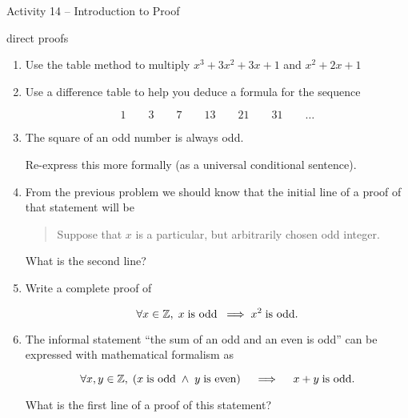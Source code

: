 \documentclass{amsart}
\begin{document}
\thispagestyle{empty}

\centerline{\Large Activity 14 -- Introduction to Proof}
\centerline{\large direct proofs}

\bigskip
\Large


\begin{enumerate}

\item Use the table method to multiply $x^3 + 3x^2 + 3x + 1$ and $x^2 + 2x + 1$

\vfill

\item Use a difference table to help you deduce a formula for the sequence

\[ 1 \qquad 3 \qquad 7 \qquad 13 \qquad 21 \qquad 31 \qquad \ldots \]


\vfill

\newpage

\item The square of an odd number is always odd.

Re-express this more formally (as a universal conditional sentence).

\vfill

\item From the previous problem we should know that the initial line of a proof of that statement will be

\begin{quote}
Suppose that $x$ is a particular, but arbitrarily chosen odd integer. 
\end{quote}

What is the second line?

\vfill

\item Write a complete proof of 

\[ \forall x \in {\mathbb Z}, \; x \; \mbox{is odd} \; \implies x^2 \; \mbox{is odd.} \]


\vfill

\vfill

\newpage

\item The informal statement ``the sum of an odd and an even is odd'' can be expressed with mathematical formalism as

\[ \forall x,y \in {\mathbb Z}, \; ( x \; \mbox{is odd} \; \land \; y \; \mbox{is even}) \quad \implies \quad x+y \; \mbox{is odd.} \]

What is the first line of a proof of this statement?

\vfill


\end{enumerate}
\end{document}
